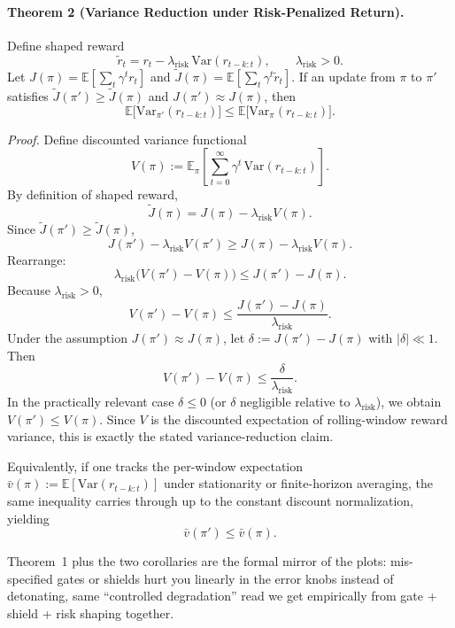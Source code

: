 \paragraph{Theorem 2 (Variance Reduction under Risk-Penalized Return).}
Define shaped reward
\[
\tilde r_t=r_t-\lambda_{\mathrm{risk}}\,\mathrm{Var}(r_{t-k:t}), \qquad \lambda_{\mathrm{risk}}>0.
\]
Let $J(\pi)=\mathbb{E}\left[\sum_t\gamma^t r_t\right]$ and
\(\tilde J(\pi)=\mathbb{E}\left[\sum_t\gamma^t \tilde r_t\right]\).
If an update from $\pi$ to $\pi'$ satisfies $\tilde J(\pi')\ge \tilde J(\pi)$ and $J(\pi')\approx J(\pi)$, then
\[
\mathbb{E}\big[\mathrm{Var}_{\pi'}(r_{t-k:t})\big] \le
\mathbb{E}\big[\mathrm{Var}_{\pi}(r_{t-k:t})\big].
\]

\textit{Proof.}
Define discounted variance functional
\[
V(\pi):=\mathbb{E}_{\pi}\left[\sum_{t=0}^{\infty}\gamma^t\,\mathrm{Var}(r_{t-k:t})\right].
\]
By definition of shaped reward,
\[
\tilde J(\pi)=J(\pi)-\lambda_{\mathrm{risk}}V(\pi).
\]
Since $\tilde J(\pi')\ge \tilde J(\pi)$,
\[
J(\pi')-\lambda_{\mathrm{risk}}V(\pi')
\ge
J(\pi)-\lambda_{\mathrm{risk}}V(\pi).
\]
Rearrange:
\[
\lambda_{\mathrm{risk}}\big(V(\pi')-V(\pi)\big)
\le
J(\pi')-J(\pi).
\]
Because $\lambda_{\mathrm{risk}}>0$,
\[
V(\pi')-V(\pi)
\le
\frac{J(\pi')-J(\pi)}{\lambda_{\mathrm{risk}}}.
\]
Under the assumption $J(\pi')\approx J(\pi)$, let $\delta:=J(\pi')-J(\pi)$ with $|\delta|\ll 1$. Then
\[
V(\pi')-V(\pi)\le \frac{\delta}{\lambda_{\mathrm{risk}}}.
\]
In the practically relevant case $\delta\le 0$ (or $\delta$ negligible relative to $\lambda_{\mathrm{risk}}$), we obtain $V(\pi')\le V(\pi)$. Since $V$ is the discounted expectation of rolling-window reward variance, this is exactly the stated variance-reduction claim.

Equivalently, if one tracks the per-window expectation $\bar v(\pi):=\mathbb{E}[\mathrm{Var}(r_{t-k:t})]$ under stationarity or finite-horizon averaging, the same inequality carries through up to the constant discount normalization, yielding
\[
\bar v(\pi')\le \bar v(\pi).
\]

Theorem~1 plus the two corollaries are the formal mirror of the plots: mis-specified gates or shields hurt you linearly in the error knobs instead of detonating, same ``controlled degradation'' read we get empirically from gate + shield + risk shaping together.
